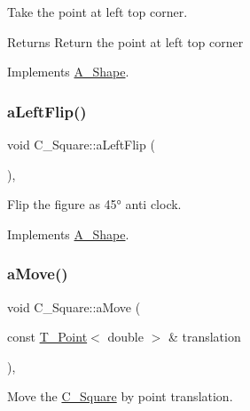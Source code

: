 Take the point at left top corner. 

\begin{DoxyReturn}{Returns}
Return the point at left top corner 
\end{DoxyReturn}


Implements \hyperlink{classA__Shape_abe6781b13037bf7ecea8ff9456b31533}{A\+\_\+\+Shape}.

\mbox{\label{classC__Square_a31d31862502f0ed24e8331af30100338}} 
\subsubsection{\texorpdfstring{a\+Left\+Flip()}{aLeftFlip()}}
{\footnotesize\ttfamily void C\+\_\+\+Square\+::a\+Left\+Flip (\begin{DoxyParamCaption}{ }\end{DoxyParamCaption})\hspace{0.3cm}{\ttfamily [override]}, {\ttfamily [virtual]}}



Flip the figure as 45° anti clock. 



Implements \hyperlink{classA__Shape_abe947e7003cb63be2b4f6c439533427d}{A\+\_\+\+Shape}.

\mbox{\label{classC__Square_a6727523558c58dcd240ec080f254e7c9}} 
\subsubsection{\texorpdfstring{a\+Move()}{aMove()}}
{\footnotesize\ttfamily void C\+\_\+\+Square\+::a\+Move (\begin{DoxyParamCaption}\item[{const \hyperlink{classT__Point}{T\+\_\+\+Point}$<$ double $>$ \&}]{translation }\end{DoxyParamCaption})\hspace{0.3cm}{\ttfamily [override]}, {\ttfamily [virtual]}}



Move the \hyperlink{classC__Square}{C\+\_\+\+Square} by point translation. 


